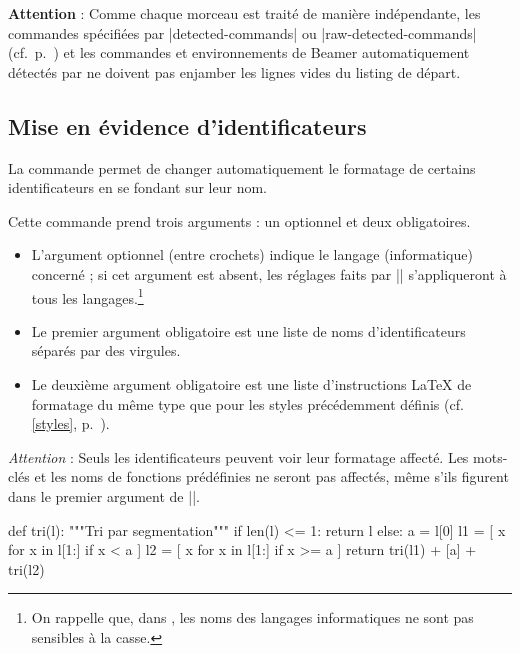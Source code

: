 \documentclass[dvipsnames,svgnames]{article}
\begin{document}
\bigskip
\textbf{Attention} : Comme chaque morceau est traité de manière indépendante, les
commandes spécifiées par |detected-commands| ou |raw-detected-commands|
(cf.~p.~\pageref{detected-commands}) et les commandes et environnements de Beamer
automatiquement détectés par  ne doivent pas enjamber les lignes vides du
listing de départ.



\bigskip
\subsection{Mise en évidence d'identificateurs}

\label{SetPitonIdentifier}

La commande  permet de changer automatiquement le
formatage de certains identificateurs en se fondant sur leur nom.

\smallskip
Cette commande prend trois arguments : un optionnel et deux obligatoires.

\begin{itemize}
\item L'argument optionnel (entre crochets) indique le langage (informatique) concerné ;
si cet argument est absent, les réglages faits par |\SetPitonIdentifier| s'appliqueront à
tous les langages.\footnote{On rappelle que, dans , les noms des langages
  informatiques ne sont pas sensibles à la casse.}

\item Le premier argument obligatoire est une liste de noms d'identificateurs séparés par
des virgules.

\item Le deuxième argument obligatoire est une liste d'instructions LaTeX de formatage du
même type que pour les styles précédemment définis (cf. \ref{styles},
p.~\pageref{styles}).


\end{itemize}

\emph{Attention} : Seuls les identificateurs peuvent voir leur formatage affecté. Les
mots-clés et les noms de fonctions prédéfinies ne seront pas affectés, même s'ils figurent
dans le premier argument de |\SetPitonIdentifier|.

\medskip
\begin{Code}
\emph{}
\begin{Piton}
def tri(l):
    """Tri par segmentation"""
    if len(l) <= 1:
        return l
    else:
        a = l[0]
        l1 = [ x for x in l[1:] if x < a  ]
        l2 = [ x for x in l[1:] if x >= a ]
        return tri(l1) + [a] + tri(l2)
\end{Piton}
\end{Code}
\end{document}
